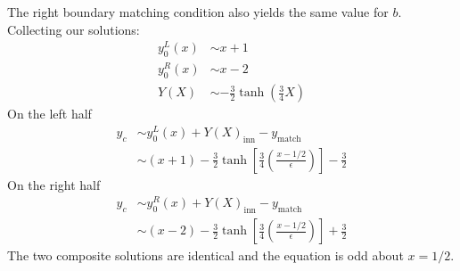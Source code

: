 The right boundary matching condition also yields the same value for $b$. Collecting our solutions:
\begin{align*}
	y_0^L(x) &\sim x+1 \\
	y_0^R(x) &\sim x-2 \\
	Y(X) &\sim -\frac{3}{2} \tanh \left(\frac{3}{4}X\right)
\end{align*}
On the left half
\begin{align*}
	y_c &\sim y_0^L(x) + Y(X)_\text{inn} - y_\text{match} \\
	& \sim (x+1) -\frac{3}{2} \tanh \left[ \frac{3}{4}\left(\frac{x-1/2}{\epsilon}\right)\right] - \frac{3}{2}
\end{align*}
On the right half
\begin{align*}
y_c &\sim y_0^R(x) + Y(X)_\text{inn} - y_\text{match} \\
& \sim (x-2) -\frac{3}{2} \tanh \left[ \frac{3}{4}\left(\frac{x-1/2}{\epsilon}\right)\right] + \frac{3}{2}
\end{align*}
The two composite solutions are identical and the equation is odd about $x=1/2$. 



